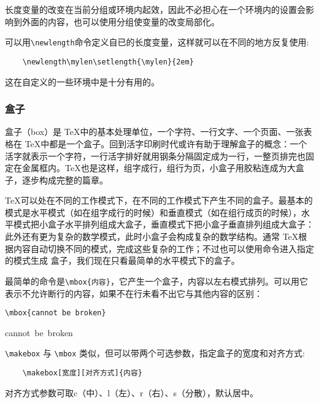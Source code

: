 长度变量的改变在当前分组或环境内起效，因此不必担心在一个环境内的设置会影响到外面的内容，也可以使用分组使变量的改变局部化。

可以用\verb|\newlength|命令定义自已的长度变量，这样就可以在不同的地方反复使用:

\begin{lstlisting}
    \newlength\mylen\setlength{\mylen}{2em}
\end{lstlisting}

这在自定义的一些环境中是十分有用的。

\subsubsection{盒子}

盒子（box）是 \TeX 中的基本处理单位，一个字符、一行文字、一个页面、一张表格在 \TeX 中都是一个盒子。回到活字印刷时代或许有助于理解盒子的概念：一个活字就表示一个字符，一行活字排好就用钢条分隔固定成为一行，一整页排完也固定在金属框内。\TeX 也是这样，组字成行，组行为页，小盒子用胶粘连成为大盒子，逐步构成完整的篇章。

\TeX 可以处在不同的工作模式下，在不同的工作模式下产生不同的盒子。最基本的模式是水平模式（如在组字成行的时候）和垂直模式（如在组行成页的时候），水平模式把小盒子水平排列组成大盒子，垂直模式下把小盒子垂直排列组成大盒子：此外还有更为复杂的数学模式，此时小盒子会构成复杂的数学结构。通常 \TeX 根据内容自动切换不同的模式，完成这些复杂的工作；不过也可以使用命令进入指定的模式生成
盒子，我们现在只看最简单的水平模式下的盒子。

最简单的命令是\verb|\mbox{内容}|，它产生一个盒子，内容以左右模式排列。可以用它表示不允许断行的内容，如果不在行未看不出它与其他内容的区别：

\begin{minipage}[t]{0.45\textwidth}
\begin{lstlisting}
\mbox{cannot be broken}
\end{lstlisting}
\end{minipage}
\hfill
\begin{minipage}[t]{0.45\textwidth}
    \mbox{cannot be broken}
\end{minipage}

\verb|\makebox| 与 \verb|\mbox| 类似，但可以带两个可选参数，指定盒子的宽度和对齐方式:
\begin{lstlisting}
    \makebox[宽度][对齐方式]{内容}
\end{lstlisting}

对齐方式参数可取c（中）、l（左）、r（右）、s（分散），默认居中。

